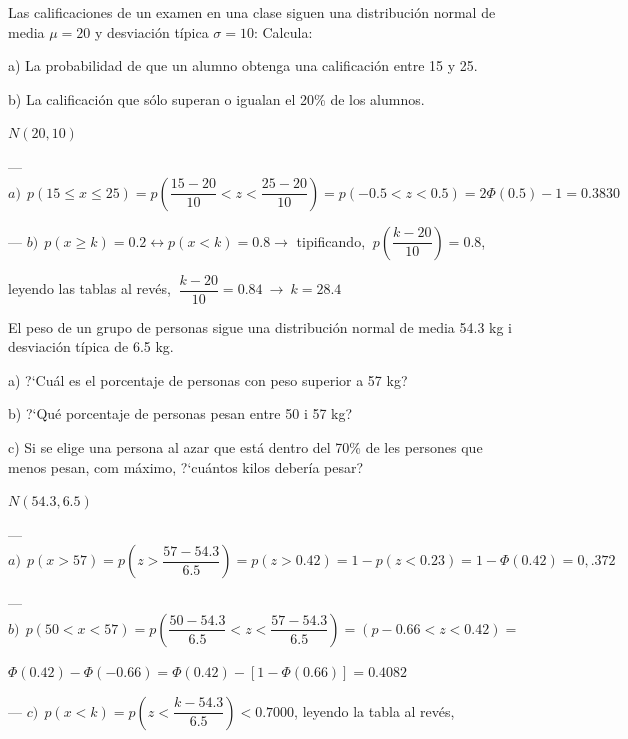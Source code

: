 \vspace{4mm}
\begin{ejemplo}
\begin{ejer}
	Las calificaciones de un examen en una clase siguen una distribución normal de media $\mu= 20$ y desviación típica $\sigma = 10$: Calcula:

a) La probabilidad de que un alumno obtenga una calificación entre 15 y 25. 

b) La calificación que sólo superan o igualan el 20\% de los alumnos.  


\end{ejer}
\end{ejemplo}

$N(20,10)$

--- $a) \ \ p(15 \le x \le 25)= p\left( \dfrac{15-20}{10}<z<\dfrac{25-20}{10} \right) = p(-0.5<z<0.5)=2\Phi(0.5)-1=0.3830$

--- $b)\ \ p(x\ge k)=0.2 \leftrightarrow p(x<k)=0.8 \to$ tipificando, $ \ p \left( \dfrac{k-20}{10} \right) = 0.8$,

leyendo las tablas al revés, $\ \dfrac{k-20}{10}=0.84 \ \to \ k=28.4$

\vspace{4mm}
\begin{ejemplo}
\begin{ejer}
	 El peso de un grupo de personas sigue una distribución normal de media 54.3 kg i desviación típica de 6.5 kg.
	 
a) ?`Cuál es el porcentaje de personas con peso superior a 57 kg?  

b) ?`Qué porcentaje de personas pesan entre 50 i 57 kg? 

c) Si se elige una persona al azar que está dentro del 70\% de les persones que menos pesan, com  máximo, ?`cuántos kilos debería  pesar? 

\end{ejer}
\end{ejemplo}

$N(54.3,6.5)$

--- $a)\ \ p(x>57) = p\left(z> \dfrac{57-54.3}{6.5} \right)=p(z> 0.42)=1-p(z<0.23)=1-\Phi(0.42)=0,.372$

--- $b)\ \ p(50<x<57) = p\left( \dfrac{50-54.3}{6.5} <z<\dfrac{57-54.3}{6.5} \right) =(p -0.66<z<0.42)=$

$\Phi(0.42)-\Phi(-0.66)= \Phi(0.42)-[1-\Phi(0.66)]= 0.4082$

--- $c)\ \ p(x<k)= p\left( z<\dfrac{k-54.3}{6.5} \right) < 0.7000 $, leyendo la tabla al revés, 


